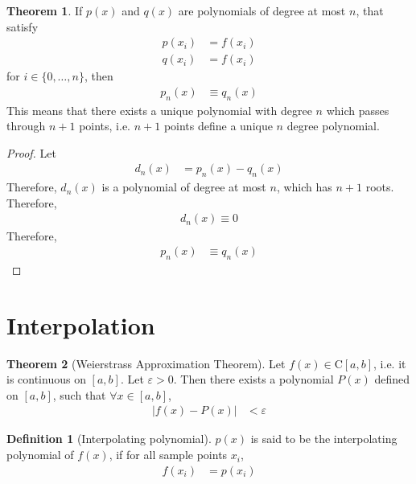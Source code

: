 \documentclass[fleqn, a4paper, 12pt, twoside]{article}
\theoremstyle{definition}
\newtheorem{definition}{Definition}
\theoremstyle{theorem}
\newtheorem{theorem}{Theorem}
\begin{document}
\begin{theorem}
	If $p(x)$ and $q(x)$ are polynomials of degree at most $n$, that satisfy
	\begin{align*}
		p(x_i) &= f(x_i)\\
		q(x_i) &= f(x_i)
	\end{align*}
	for $i \in \{0,\dots,n\}$, then
	\begin{align*}
		p_n(x) &\equiv q_n(x)
	\end{align*}
	This means that there exists a unique polynomial with degree $n$ which passes through $n + 1$ points, i.e. $n + 1$ points define a unique $n$ degree polynomial.
\end{theorem}

\begin{proof}
	Let
	\begin{align*}
		d_n(x) &= p_n(x) - q_n(x)
	\end{align*}
	Therefore, $d_n(x)$ is a polynomial of degree at most $n$, which has $n + 1$ roots.
	Therefore,
	\begin{align*}
		d_n(x) \equiv 0
	\end{align*}
	Therefore,
	\begin{align*}
		p_n(x) &\equiv q_n(x)
	\end{align*}
\end{proof}

\section{Interpolation}

\begin{theorem}[Weierstrass Approximation Theorem]
	Let $f(x) \in \mathrm{C} [a,b]$, i.e. it is continuous on $[a,b]$.
	Let $\varepsilon > 0$.
	Then there exists a polynomial $P(x)$ defined on $[a,b]$, such that $\forall x \in [a,b]$,
	\begin{align*}
		\left| f(x) - P(x) \right| &< \varepsilon
	\end{align*}
	\label{Weierstrass_Approximation_Theorem}
\end{theorem}

\begin{definition}[Interpolating polynomial]
	$p(x)$ is said to be the interpolating polynomial of $f(x)$, if for all sample points $x_i$,
	\begin{align*}
		f(x_i) & = p(x_i)
	\end{align*}
\end{definition}
\end{document}
